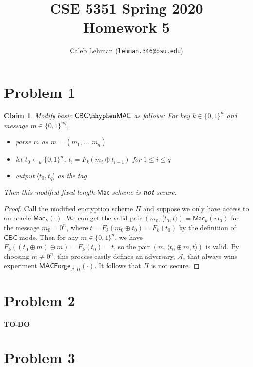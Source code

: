 \documentclass[12pt]{article}
\title{%
CSE 5351 Spring 2020\\
Homework 5
}
\author{%
Caleb Lehman
(\href{mailto:lehman.346@osu.edu}{\texttt{lehman.346@osu.edu}})
}
\date{%
}
\numberwithin{equation}{section}
\theoremstyle{plain}
\newtheorem{claim}{Claim}
\newcommand{\set}[1]{\{ #1 \}}
\newcommand{\algo}[1]{\mathsf{#1}}
\newcommand{\adv}{\mathcal{A}}
\newcommand{\mac}{\algo{Mac}}
\newcommand{\macexpir}[2]{\algo{MACForge}_{{#1},{#2}}}
\begin{document}
\maketitle

\section*{Problem 1}

\begin{claim}
Modify basic $\algo{CBC}\mhyphen \algo{MAC}$ as follows:
For key $k \in \set{ 0, 1 }^n$ and message $m \in \set{ 0, 1 }^{nq}$,
\begin{itemize}
    \item parse $m$ as $m = (m_1, \ldots, m_q)$
    \item let $t_0 \gets_u \set{ 0, 1 }^n$,
    $t_i = F_k(m_i \oplus t_{i-1})$ for $1 \leq i \leq q$
    \item output $\langle t_0, t_q \rangle$ as the tag
\end{itemize}
Then this modified fixed-length $\mac$ scheme is \textbf{not} secure.
\end{claim}
\begin{proof}
Call the modified encryption scheme $\Pi$
and suppose we only have access to an oracle $\mac_k(\cdot)$.
We can get the valid pair $(m_0, \langle t_0, t \rangle) = \mac_k(m_0)$ for the message $m_0 = 0^n$,
where $t = F_k(m_0 \oplus t_0) = F_k(t_0)$ by the definition of $\algo{CBC}$ mode.
Then for any $m \in \set{ 0, 1 }^n$, we have
$F_k((t_0 \oplus m) \oplus m) = F_k(t_0) = t$,
so the pair $(m, \langle t_0 \oplus m, t \rangle)$ is valid.
By choosing $m \neq 0^n$, this process easily defines an adversary, $\adv$,
that always wins experiment $\macexpir{\adv}{\Pi}(\cdot)$.
It follows that $\Pi$ is not secure.
\end{proof}

\section*{Problem 2}

\textbf{TO-DO}

\section*{Problem 3}
\end{document}
